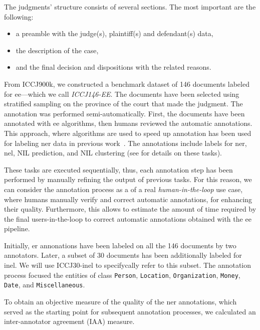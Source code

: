 The judgments' structure consists of several sections. The most important are the following:
\begin{itemize}
    \item a preamble with the judge(s), plaintiff(s) and defendant(s) data,
    \item the description of the case,
    \item and the final decision and dispositions with the related reasons.
\end{itemize}


From ICCJ900k, we constructed a benchmark dataset of 146 documents labeled for \acf{ee}---which we call \emph{ICCJ146-EE}. The documents have been selected using stratified sampling on the province of the court that made the judgment.
The annotation was performed semi-automatically. First, the documents have been annotated with \ac{ee} algorithms, then humans reviewed the automatic annotations. This approach, where algorithms are used to speed up annotation has been used for labeling \ac{ner} data in previous work~\cite{lrec2022kind}.
The annotations include labels for \ac{ner}, \ac{nel}, NIL prediction, and NIL clustering (see  for details on these tasks).

These tasks are executed sequentially, thus, each annotation step has been performed by manually refining the output of previous tasks. For this reason, we can consider the annotation process as a  of a real \emph{human-in-the-loop} use case, where humans manually verify and correct automatic annotations, for enhancing their quality.
Furthermore, this  allows to estimate the amount of time required by the final users-in-the-loop to correct automatic annotations obtained with the \ac{ee} pipeline.

Initially, \ac{er} annonations have been labeled on all the 146 documents by two annotators. Later, a subset of 30 documents has been additionally labeled for \ac{inel}. We will use ICCJ30-\ac{inel} to specifycally refer to this subset.
The annotation process focused the entities of class \texttt{Person}, \texttt{Location}, \texttt{Organization}, \texttt{Money}, \texttt{Date}, and \texttt{Miscellaneous}.


To obtain an objective measure of the quality of the \ac{ner} annotations, which served as the starting point for subsequent annotation processes, we calculated an inter-annotator agreement (IAA) measure.

